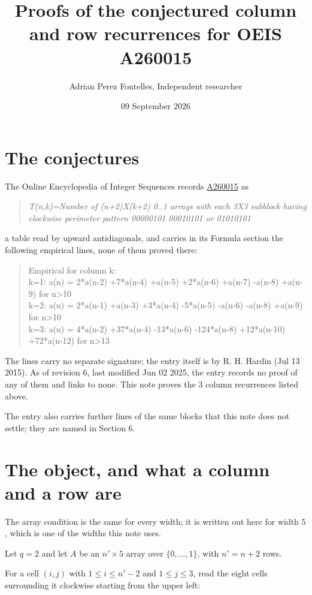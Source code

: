 \documentclass[11pt]{article}
\title{Proofs of the conjectured column and row recurrences for OEIS A260015}
\author{Adrian Perez Fontelles, Independent researcher}
\date{09 September 2026}
\theoremstyle{definition}
\begin{document}
\maketitle
\section{The conjectures}

The Online Encyclopedia of Integer Sequences records \href{https://oeis.org/A260015}{A260015} as

\begin{quote}\itshape T(n,k)=Number of (n+2)X(k+2) 0..1 arrays with each 3X3 subblock having clockwise perimeter pattern 00000101 00010101 or 01010101\end{quote}

a table read by upward antidiagonals, and carries in its Formula section the following empirical lines, none of them proved there:

\begin{quote}\ttfamily Empirical for column k:\\
k=1: a(n) = 2*a(n-2) +7*a(n-4) +a(n-5) +2*a(n-6) +a(n-7) -a(n-8) +a(n-9) for n>10\\k=2: a(n) = 2*a(n-1) +a(n-3) +3*a(n-4) -5*a(n-5) -a(n-6) -a(n-8) +a(n-9) for n>10\\k=3: a(n) = 4*a(n-2) +37*a(n-4) -13*a(n-6) -124*a(n-8) +12*a(n-10) +72*a(n-12) for n>13\end{quote}

The lines carry no separate signature; the entry itself is by R. H. Hardin (Jul 13 2015). As of revision 6, last modified Jun 02 2025, the entry records no proof of any of them and links to none. This note proves the 3 column recurrences listed above.

The entry also carries further lines of the same blocks that this note does not settle; they are named in Section 6.

\section{The object, and what a column and a row are}

The array condition is the same for every width; it is written out here for width $5$, which is one of the widths this note uses.

Let $q = 2$ and let $A$ be an $n' \times 5$ array over $\{0,\dots,1\}$, with $n' = n + 2$ rows.

For a cell $(i,j)$ with $1 \le i \le n'-2$ and $1 \le j \le 3$, read the eight cells surrounding it clockwise starting from the upper left:
\end{document}
